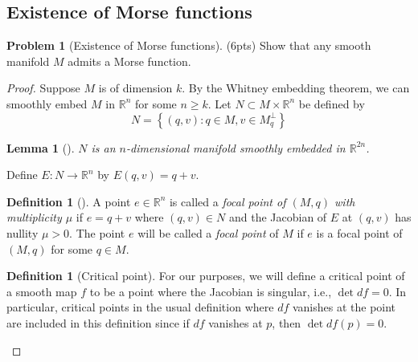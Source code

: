 \documentclass[reqno]{amsart}
\newtheorem{lemma}[theorem]{Lemma}
\theoremstyle{definition}
\newtheorem{definition}[theorem]{Definition}
\newtheorem{problem}[theorem]{Problem}
\theoremstyle{remark}
\begin{document}
    \subsection{Existence of Morse functions}

    \begin{problem}[Existence of Morse functions]
        (6pts) Show that any smooth manifold $M$ admits
        a Morse function.
    \end{problem}

    \begin{proof}
        Suppose $M$ is of dimension $k$. By the Whitney embedding
        theorem, we can smoothly
        embed $M$ in $\mathbb{R}^{n}$ for some
        $n\ge k$.
        Let $N \subset M \times \mathbb{R}^{n}$ be
        defined by
        \[
        N = \left\{ \left( q,v \right) \colon
        q \in M, v \in  M_q^{\perp} \right\} 
        \] 
        \begin{lemma}[]
            $N$ is an $n$-dimensional manifold smoothly
            embedded in $\mathbb{R}^{2n}$.
        \end{lemma}

        Define
        $E \colon N \to \mathbb{R}^{n}$ by
        $E(q,v) = q+v$.

        \begin{definition}[]
            A point $e \in \mathbb{R}^{n}$ is called
            a \textit{focal point of $(M,q)$ with
            multiplicity $\mu$ } if
        $e = q+v$ where
    $(q,v) \in N$ and the Jacobian of $E$ at
    $\left( q,v \right) $ has nullity
    $\mu > 0$. The point $e$ will be called a \textit{focal point}
    of $M$ if $e$ is a focal point of $\left( M,q \right) $ 
    for some $q \in M$.
        \end{definition}

        \begin{definition}[Critical point]
            For our purposes, we will define
            a critical point of a smooth map
            $f$ to be a point where the Jacobian is
            singular, i.e., $\det df = 0$.
            In particular, critical points in the usual definition
            where $df$ vanishes at the point are included in this
            definition since if $df$ vanishes at $p$, then
            $\det df(p) = 0$.
        \end{definition}



\end{proof}
\end{document}
